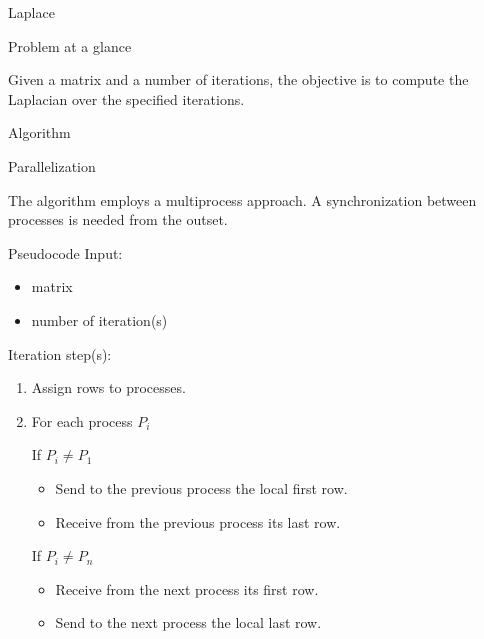 \begin{chapter}{Laplace}
    \begin{section}{Problem at a glance}
        \par Given a matrix and a number of iterations, the objective is to compute the Laplacian over the specified iterations.
    \end{section}
    \begin{section}{Algorithm}
        \begin{subsection}{Parallelization}
            \par The algorithm employs a multiprocess approach. A synchronization between processes is needed from the outset.
        \end{subsection}
        \begin{subsection}{Pseudocode}
            Input:
            \begin{itemize}
                \item matrix
                \item number of iteration(s)
            \end{itemize}
            Iteration step(s):
            \begin{enumerate}
                \item Assign rows to processes.
                \item For each process $P_i$
                \begin{enumerate}
                    \begin{item}
                        If $P_i \neq P_1$
                        \begin{itemize}
                            \item Send to the previous process the local first row.
                            \item Receive from the previous process its last row.
                        \end{itemize}
                    \end{item}
                    \begin{item}
                        If $P_i \neq P_n$
                        \begin{itemize}
                            \item Receive from the next process its first row.
                            \item Send to the next process the local last row.
                        \end{itemize}
                    \end{item}

\end{enumerate}
\end{enumerate}
\end{subsection}
\end{section}
\end{chapter}
